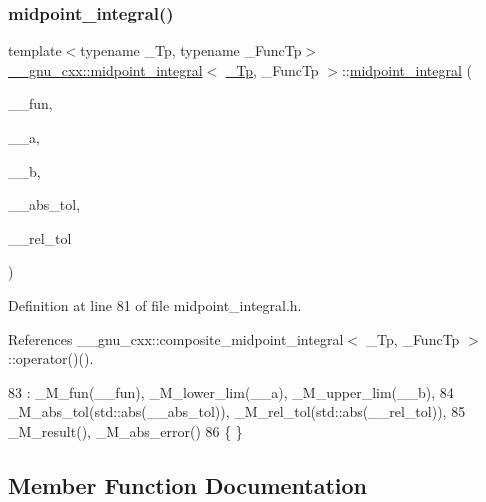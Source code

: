 \subsubsection{\texorpdfstring{midpoint\+\_\+integral()}{midpoint\_integral()}}
{\footnotesize\ttfamily template$<$typename \+\_\+\+Tp, typename \+\_\+\+Func\+Tp$>$ \\
\hyperlink{class____gnu__cxx_1_1midpoint__integral}{\+\_\+\+\_\+gnu\+\_\+cxx\+::midpoint\+\_\+integral}$<$ \hyperlink{namespace____gnu__cxx_a3b19a9c800ca194374ef9172290f7d79}{\+\_\+\+Tp}, \+\_\+\+Func\+Tp $>$\+::\hyperlink{class____gnu__cxx_1_1midpoint__integral}{midpoint\+\_\+integral} (\begin{DoxyParamCaption}\item[{\+\_\+\+Func\+Tp}]{\+\_\+\+\_\+fun,  }\item[{\hyperlink{namespace____gnu__cxx_a3b19a9c800ca194374ef9172290f7d79}{\+\_\+\+Tp}}]{\+\_\+\+\_\+a,  }\item[{\hyperlink{namespace____gnu__cxx_a3b19a9c800ca194374ef9172290f7d79}{\+\_\+\+Tp}}]{\+\_\+\+\_\+b,  }\item[{\hyperlink{namespace____gnu__cxx_a3b19a9c800ca194374ef9172290f7d79}{\+\_\+\+Tp}}]{\+\_\+\+\_\+abs\+\_\+tol,  }\item[{\hyperlink{namespace____gnu__cxx_a3b19a9c800ca194374ef9172290f7d79}{\+\_\+\+Tp}}]{\+\_\+\+\_\+rel\+\_\+tol }\end{DoxyParamCaption})\hspace{0.3cm}{\ttfamily [inline]}}



Definition at line 81 of file midpoint\+\_\+integral.\+h.



References \+\_\+\+\_\+gnu\+\_\+cxx\+::composite\+\_\+midpoint\+\_\+integral$<$ \+\_\+\+Tp, \+\_\+\+Func\+Tp $>$\+::operator()().


\begin{DoxyCode}
83       : \_M\_fun(\_\_fun), \_M\_lower\_lim(\_\_a), \_M\_upper\_lim(\_\_b),
84         \_M\_abs\_tol(std::abs(\_\_abs\_tol)), \_M\_rel\_tol(std::abs(\_\_rel\_tol)),
85         \_M\_result(), \_M\_abs\_error()
86       \{ \}
\end{DoxyCode}


\subsection{Member Function Documentation}
\mbox{\label{class____gnu__cxx_1_1midpoint__integral_a2a94b9b48126ac73821c1e38223bfc33}} 

